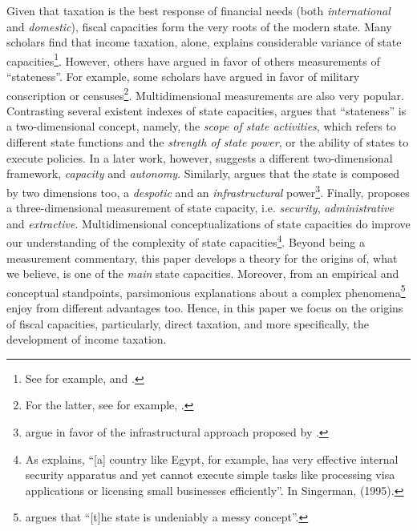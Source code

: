 \documentclass[onesided]{article}\usepackage[]{graphicx}\usepackage[]{color}
\begin{document}
Given that taxation is the best response of financial needs (both \emph{international} and \emph{domestic}), fiscal capacities form the very roots of the modern state. Many scholars find that income taxation, alone, explains considerable variance of state capacities\footnote{See for example, \citet[p. 15]{Hanson2013b} and \citet[]{Centeno:2002qf}.}. However, others have argued in favor of others measurements of ``stateness''. For example, some scholars have argued in favor of military conscription or censuses\footnote{For the latter, see for example, \citet{Lee2013a}.}. Multidimensional measurements are also very popular. Contrasting several existent indexes of state capacities, \citet[p. 7]{Fukuyama:2004nr} argues that ``stateness'' is a two-dimensional concept, namely, the \emph{scope of state activities}, which refers to different state functions and the \emph{strength of state power}, or the ability of states to execute policies. In a later work, however, \citet[p. 347]{Fukuyama2013}  suggests a  different two-dimensional framework, \emph{capacity} and \emph{autonomy}. Similarly, \citet[p. 357]{Mann2008a} argues that the state is composed by two dimensions too, a \emph{despotic} and an \emph{infrastructural} power\footnote{
	\citet[p. 224]{Soifer2008} argue in favor of the infrastructural approach proposed by \citet[]{Mann1984a}.
	}. Finally, \citet{Soifer2012} proposes a three-dimensional measurement of state capacity, i.e. \emph{security}, \emph{administrative} and \emph{extractive}. Multidimensional conceptualizations of state capacities do improve our understanding of the complexity of state capacities\footnote{
	As \citet[p. 9]{Fukuyama:2004nr} explains, ``[a] country like Egypt, for example, has very effective internal security apparatus and yet cannot execute simple tasks like processing visa applications or licensing small businesses efficiently''. In Singerman, (1995).
	}. Beyond being a measurement commentary, this paper develops a theory for the origins of, what we believe, is one of the \emph{main} state capacities. Moreover, from an empirical and conceptual standpoints, parsimonious explanations about a complex phenomena\footnote{
	\citet[p. 112]{Mann1984a} argues that ``[t]he state is undeniably a messy concept''.
	} enjoy from different advantages too. Hence, in this paper we focus on the origins of fiscal capacities, particularly, direct taxation, and more specifically, the development of income taxation.
\end{document}
